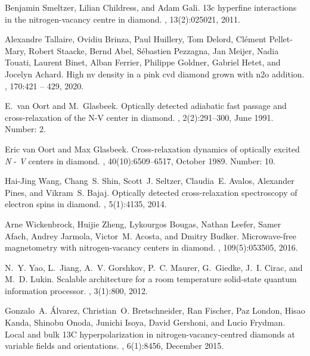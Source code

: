 \documentclass[9pt,twocolumn,twoside]{revtex4-1}
\begin{document}
\begin{thebibliography}{10}
Benjamin Smeltzer, Lilian Childress, and Adam Gali.
\newblock 13c hyperfine interactions in the nitrogen-vacancy centre in diamond.
, 13(2):025021, 2011.

Alexandre Tallaire, Ovidiu Brinza, Paul Huillery, Tom Delord, Clément
  Pellet-Mary, Robert Staacke, Bernd Abel, Sébastien Pezzagna, Jan Meijer,
  Nadia Touati, Laurent Binet, Alban Ferrier, Philippe Goldner, Gabriel Hetet,
  and Jocelyn Achard.
\newblock High nv density in a pink cvd diamond grown with n2o addition.
, 170:421 -- 429, 2020.

E.~van Oort and M.~Glasbeek.
\newblock Optically detected adiabatic fast passage and cross-relaxation of the
  {N}-{V} center in diamond.
, 2(2):291--300, June 1991.
\newblock Number: 2.

Eric van Oort and Max Glasbeek.
\newblock Cross-relaxation dynamics of optically excited \textit{{N}} -
  \textit{{V}} centers in diamond.
, 40(10):6509--6517, October 1989.
\newblock Number: 10.

Hai-Jing Wang, Chang~S. Shin, Scott~J. Seltzer, Claudia~E. Avalos, Alexander
  Pines, and Vikram~S. Bajaj.
\newblock Optically detected cross-relaxation spectroscopy of electron spins in
  diamond.
, 5(1):4135, 2014.

Arne Wickenbrock, Huijie Zheng, Lykourgos Bougas, Nathan Leefer, Samer Afach,
  Andrey Jarmola, Victor~M. Acosta, and Dmitry Budker.
\newblock Microwave-free magnetometry with nitrogen-vacancy centers in diamond.
, 109(5):053505, 2016.

N.~Y. Yao, L.~Jiang, A.~V. Gorshkov, P.~C. Maurer, G.~Giedke, J.~I. Cirac, and
  M.~D. Lukin.
\newblock Scalable architecture for a room temperature solid-state quantum
  information processor.
, 3(1):800, 2012.

Gonzalo~A. Álvarez, Christian~O. Bretschneider, Ran Fischer, Paz London, Hisao
  Kanda, Shinobu Onoda, Junichi Isoya, David Gershoni, and Lucio Frydman.
\newblock Local and bulk {13C} hyperpolarization in nitrogen-vacancy-centred
  diamonds at variable fields and orientations.
, 6(1):8456, December 2015.

\end{thebibliography}
\end{document}
